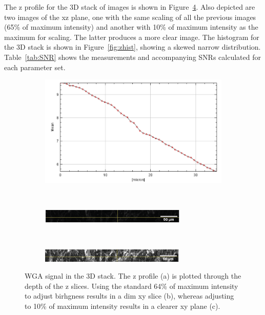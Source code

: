 \documentclass[12pt]{article}
\begin{document}
The z profile for the 3D stack of images is shown in Figure~\ref{fig:xy_plane}. Also depicted are two images of the xz plane, one with the same scaling of all the previous images (65\% of maximum intensity) and another with 10\% of maximum intensity as the maximum for scaling. The latter produces a more clear image. The histogram for the 3D stack is shown in Figure~\ref{fig:zhist}, showing a skewed narrow distribution. Table~\ref{tab:SNR} shows the measurements and accompanying SNRs calculated for each parameter set.

\begin{figure}[H]
	\begin{subfigure}{.95\textwidth}
		\centering
		\includegraphics[width=.95\linewidth]{FinalFigures/Z_profile.png}
		\caption{}
		\label{fig:zprof}
	\end{subfigure}%
\\
	\begin{subfigure}{.95\textwidth}
		\centering
		\includegraphics[width=.95\linewidth]{FinalFigures/xy_lowBright.png}
		\caption{}
		\label{fig:xy_low}
	\end{subfigure}%
\\
	\begin{subfigure}{.95\textwidth}
		\centering
		\includegraphics[width=.95\linewidth]{FinalFigures/xy_highBright.png}
		\caption{}
		\label{fig:xy_high}
	\end{subfigure}%
	\caption{WGA signal in the 3D stack. The z profile (a) is plotted through the depth of the z slices. Using the standard 64\% of maximum intensity to adjust birhgness results in a dim xy slice (b), whereas adjusting to 10\% of maximum intensity results in a clearer xy plane (c).}
	\label{fig:xy_plane}
\end{figure}
\end{document}
